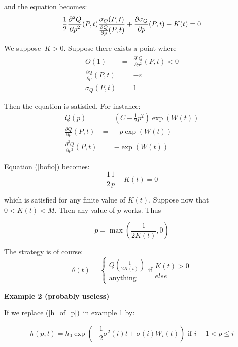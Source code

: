 \documentclass{article}
\begin{document}
and the equation becomes:%
\begin{equation}
\frac{1}{2}\frac{\partial ^{2}Q}{\partial p^{2}}(P,t)\frac{\sigma _{Q}(P,t)}{%
\frac{\partial Q}{\partial p}(P,t)}+\frac{\partial \sigma _{Q}}{\partial p}%
(P,t)-K(t)=0  \label{bofio}
\end{equation}

We suppose $\ K>0$. Suppose there exists a point where
\begin{eqnarray*}
O(1) &=&\frac{\partial ^{2}Q}{\partial p^{2}}(P,t)<0 \\
\frac{\partial Q}{\partial p}(P,t) &=&-\varepsilon \\
\sigma _{Q}(P,t) &=&1
\end{eqnarray*}

Then the equation is satisfied. For instance:%
\begin{eqnarray*}
Q(p) &=&(C-\frac{1}{2}p^{2})\exp (W(t)) \\
\frac{\partial Q}{\partial p}(P,t) &=&-p\exp (W(t)) \\
\frac{\partial ^{2}Q}{\partial p^{2}}(P,t) &=&-\exp (W(t))
\end{eqnarray*}

Equation (\ref{bofio}) becomes:%
\begin{equation*}
\frac{1}{2}\frac{1}{p}-K(t)=0
\end{equation*}

which is satisfied for any finite value of $K(t)$. Suppose now that $%
0<K(t)<M $. Then any value of $p$ works. Thus

\begin{equation*}
p=\max (\frac{1}{2K(t)},0)
\end{equation*}

The strategy is of course:%
\begin{equation*}
\theta (t)=\left\{
\begin{array}{c}
Q(\frac{1}{2K(t)}) \\
\text{anything}%
\end{array}%
\right. \text{if}%
\begin{array}{c}
K(t)>0 \\
else%
\end{array}%
\end{equation*}

\bigskip

\textbf{Example 2 (probably useless)}

If we replace (\ref{h_of_p})\ in example 1 by:

\begin{equation*}
h(p,t)=h_{0}\exp (-\frac{1}{2}\sigma ^{2}(i)t+\sigma (i)W_{i}(t))\text{ if }%
i-1<p\leq i
\end{equation*}%
\bigskip
\end{document}
